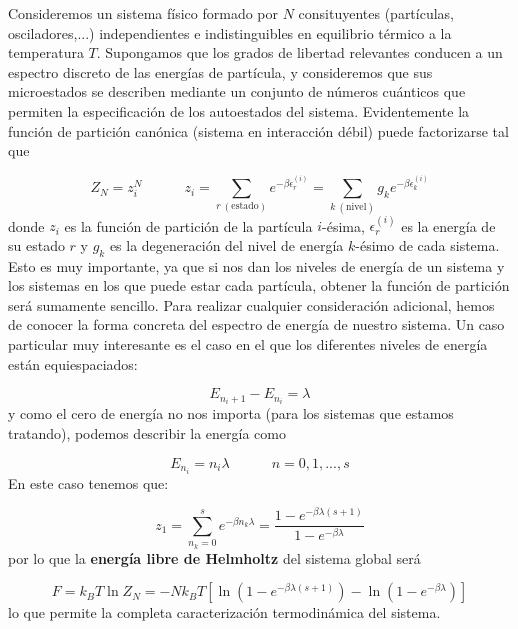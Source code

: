 \documentclass[12pt,a4paper]{article}
\numberwithin{equation}{section}
\numberwithin{figure}{section}
\newcommand{\tquad}{\quad \quad \quad}
\newcommand{\parentesis}[1]{\left( #1  \right)}
\newcommand{\ccorchetes}[1]{\left[ #1  \right]}
\theoremstyle{definition}
\begin{document}
Consideremos un sistema físico formado por $N$ consituyentes (partículas, osciladores,...) independientes e indistinguibles en equilibrio térmico a la temperatura $T$. Supongamos que los grados de libertad relevantes conducen a un espectro discreto de las energías de partícula, y consideremos que sus microestados se describen mediante un conjunto de números cuánticos que permiten la especificación de los autoestados del sistema. Evidentemente la función de partición canónica (sistema en interacción débil) puede factorizarse tal que

\begin{equation}
Z_N = z_i^N \tquad z_i = \sum_{r \ (\mathrm{estado})} e^{-\beta \epsilon_r^{(i)}} = \sum_{k \ (\mathrm{nivel})} g_k e^{-\beta \epsilon_k^{(i)}}
\end{equation}
donde $z_i$ es la función de partición de la partícula $i$-ésima, $\epsilon_r^{(i)}$ es la energía de su estado $r$ y $g_k$ es la degeneración del nivel de energía $k$-ésimo de cada sistema. Esto es muy importante, ya que si nos dan los niveles de energía de un sistema y los sistemas en los que puede estar cada partícula, obtener la función de partición será sumamente sencillo. Para realizar cualquier consideración adicional, hemos de conocer la forma concreta del espectro de energía de nuestro sistema. Un caso particular muy interesante es el caso en el que los diferentes niveles de energía están equiespaciados: 

\begin{equation}
E_{n_i+1} - E_{n_i} = \lambda 
\end{equation}
y como el cero de energía no nos importa (para los sistemas que estamos tratando), podemos describir la energía como

\begin{equation}
E_{n_i} = n_i \lambda \tquad n=0,1,...,s
\end{equation}
En este caso tenemos que:

\begin{equation}
z_1 = \sum_{n_k=0}^s e^{-\beta n_k \lambda} = \frac{1- e^{-\beta \lambda (s+1)}}{1-e^{-\beta \lambda}}
\end{equation}
por lo que la \textbf{energía libre de Helmholtz} del sistema global será

\begin{equation}
F = k_B T \ln Z_N = - N k_B T \ccorchetes{\ln \parentesis{1-e^{-\beta \lambda (s+1)}} -  \ln \parentesis{1-e^{-\beta \lambda}}}
\end{equation}
lo que permite la completa caracterización termodinámica del sistema. \\
\end{document}
